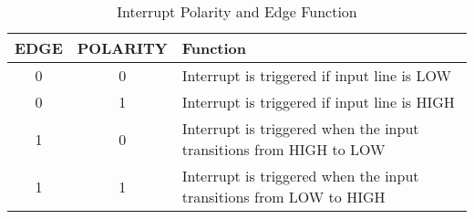 \begin{table}[ht]
	\begin{center}
		\begin{tabular}{|c|c|l|} \hline
            EDGE & POLARITY & Function \\\hline\hline
            0    & 0        & Interrupt is triggered if input line is LOW \\\hline
            0    & 1        & Interrupt is triggered if input line is HIGH \\\hline
            1    & 0        & Interrupt is triggered when the input transitions from HIGH to LOW \\\hline
            1    & 1        & Interrupt is triggered when the input transitions from LOW to HIGH \\\hline
        \end{tabular}
    \end{center}
	\caption{Interrupt Polarity and Edge Function}
	\label{tab:int_pol_edge}
\end{table}
